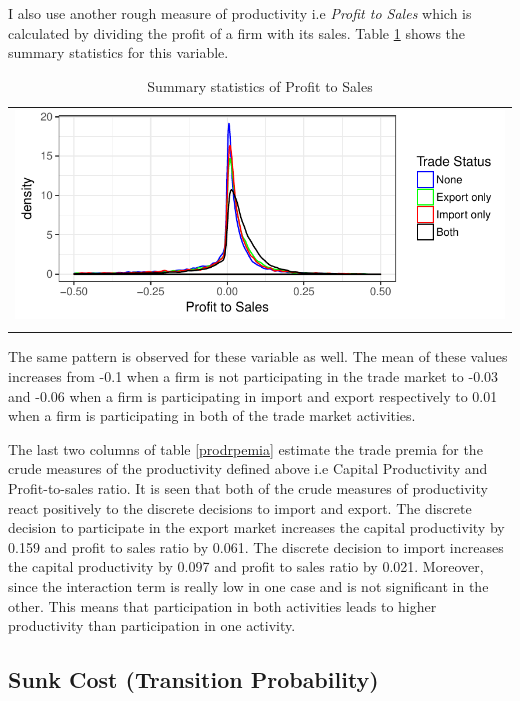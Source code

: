 \documentclass[11pt]{article}
\begin{document}
I also use another rough measure of productivity i.e
\textit{Profit to Sales} which is calculated by dividing the profit of
a firm with its sales. Table \ref{tab:pts} shows the summary
statistics for this variable. 
\begin{center}
\begin{table}[htp]
\caption{Summary statistics of Profit to Sales}
\label{tab:pts}
\begin{tabular}{c}
 \includegraphics{./PICS/denspatsales.pdf}   \\ 
   \\  
\end{tabular}
\end{table}
\end{center}
The same pattern is observed for these variable as well. The mean of
these values increases from -0.1 when a firm is not participating in
the trade market to -0.03 and  -0.06 when a firm is participating in
import and export respectively to 0.01 when a firm is participating in
both of the trade market activities.  

The last two columns of table \ref{prodrpemia} estimate the trade
premia for the crude measures of the productivity defined above i.e
Capital Productivity and Profit-to-sales ratio. It is seen that both
of the crude measures of productivity react positively to the discrete
decisions to import and export. The discrete decision to participate
in the export market increases the capital productivity by 0.159 and
profit to sales ratio by 0.061. The discrete decision to import
increases the  capital productivity by 0.097 and
profit to sales ratio by 0.021. 
Moreover, since the interaction term is really low in one case and 
is not significant in the other.  This means that participation in both activities
leads to higher productivity than participation in one activity. 
\subsection{Sunk Cost (Transition Probability)}
\end{document}
